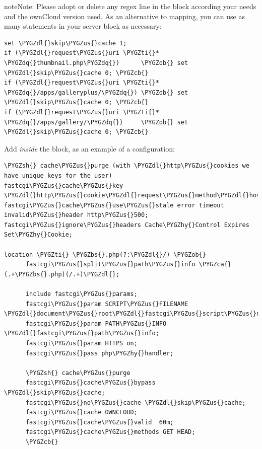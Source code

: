 \documentclass[letterpaper,10pt,english]{sphinxmanual}
\def\PYGZbs{\char`\\}
\def\PYGZus{\char`\_}
\def\PYGZob{\char`\{}
\def\PYGZcb{\char`\}}
\def\PYGZca{\char`\^}
\def\PYGZsh{\char`\#}
\def\PYGZdl{\char`\$}
\def\PYGZhy{\char`\-}
\def\PYGZdq{\char`\"}
\def\PYGZti{\char`\~}
\begin{document}
\begin{notice}{note}{Note:}
Please adopt or delete any regex line in the  block according
your needs and the ownCloud version used.
As an alternative to mapping, you can use as many  statements in
your server block as necessary:

\begin{Verbatim}[commandchars=\\\{\}]
set \PYGZdl{}skip\PYGZus{}cache 1;
if (\PYGZdl{}request\PYGZus{}uri \PYGZti{}* \PYGZdq{}thumbnail.php\PYGZdq{})      \PYGZob{} set \PYGZdl{}skip\PYGZus{}cache 0; \PYGZcb{}
if (\PYGZdl{}request\PYGZus{}uri \PYGZti{}* \PYGZdq{}/apps/galleryplus/\PYGZdq{}) \PYGZob{} set \PYGZdl{}skip\PYGZus{}cache 0; \PYGZcb{}
if (\PYGZdl{}request\PYGZus{}uri \PYGZti{}* \PYGZdq{}/apps/gallery/\PYGZdq{})     \PYGZob{} set \PYGZdl{}skip\PYGZus{}cache 0; \PYGZcb{}
\end{Verbatim}
\end{notice}

Add \emph{inside} the  block, as an example of a configuration:

\begin{Verbatim}[commandchars=\\\{\}]
\PYGZsh{} cache\PYGZus{}purge (with \PYGZdl{}http\PYGZus{}cookies we have unique keys for the user)
fastcgi\PYGZus{}cache\PYGZus{}key \PYGZdl{}http\PYGZus{}cookie\PYGZdl{}request\PYGZus{}method\PYGZdl{}host\PYGZdl{}request\PYGZus{}uri;
fastcgi\PYGZus{}cache\PYGZus{}use\PYGZus{}stale error timeout invalid\PYGZus{}header http\PYGZus{}500;
fastcgi\PYGZus{}ignore\PYGZus{}headers Cache\PYGZhy{}Control Expires Set\PYGZhy{}Cookie;

location \PYGZti{} \PYGZbs{}.php(?:\PYGZdl{}/) \PYGZob{}
      fastcgi\PYGZus{}split\PYGZus{}path\PYGZus{}info \PYGZca{}(.+\PYGZbs{}.php)(/.+)\PYGZdl{};

      include fastcgi\PYGZus{}params;
      fastcgi\PYGZus{}param SCRIPT\PYGZus{}FILENAME \PYGZdl{}document\PYGZus{}root\PYGZdl{}fastcgi\PYGZus{}script\PYGZus{}name;
      fastcgi\PYGZus{}param PATH\PYGZus{}INFO \PYGZdl{}fastcgi\PYGZus{}path\PYGZus{}info;
      fastcgi\PYGZus{}param HTTPS on;
      fastcgi\PYGZus{}pass php\PYGZhy{}handler;

      \PYGZsh{} cache\PYGZus{}purge
      fastcgi\PYGZus{}cache\PYGZus{}bypass \PYGZdl{}skip\PYGZus{}cache;
      fastcgi\PYGZus{}no\PYGZus{}cache \PYGZdl{}skip\PYGZus{}cache;
      fastcgi\PYGZus{}cache OWNCLOUD;
      fastcgi\PYGZus{}cache\PYGZus{}valid  60m;
      fastcgi\PYGZus{}cache\PYGZus{}methods GET HEAD;
      \PYGZcb{}
\end{Verbatim}
\end{document}
